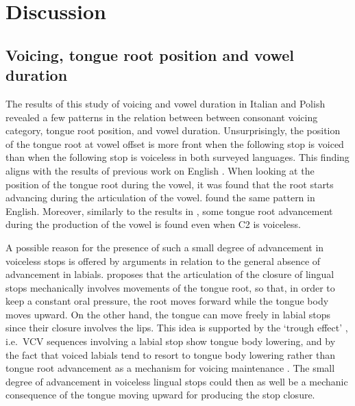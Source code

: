 \documentclass[12pt,]{article}
\begin{document}
\hypertarget{discussion}{%
\section{Discussion}\label{discussion}}

\label{s:discussion}

\hypertarget{voicing-tongue-root-position-and-vowel-duration}{%
\subsection{Voicing, tongue root position and vowel
duration}\label{voicing-tongue-root-position-and-vowel-duration}}

The results of this study of voicing and vowel duration in Italian and
Polish revealed a few patterns in the relation between between consonant
voicing category, tongue root position, and vowel duration.
Unsurprisingly, the position of the tongue root at vowel offset is more
front when the following stop is voiced than when the following stop is
voiceless in both surveyed languages. This finding aligns with the
results of previous work on English
\citep{kent1969, perkell1969, westbury1983, ahn2018}. When looking at
the position of the tongue root during the vowel, it was found that the
root starts advancing during the articulation of the vowel.
\citet{westbury1983} found the same pattern in English. Moreover,
similarly to the results in \citet{westbury1983}, some tongue root
advancement during the production of the vowel is found even when C2 is
voiceless.

A possible reason for the presence of such a small degree of advancement
in voiceless stops is offered by arguments in relation to the general
absence of advancement in labials. \citet{westbury1983} proposes that
the articulation of the closure of lingual stops mechanically involves
movements of the tongue root, so that, in order to keep a constant oral
pressure, the root moves forward while the tongue body moves upward. On
the other hand, the tongue can move freely in labial stops since their
closure involves the lips. This idea is supported by the `trough effect'
\citep{vazquez-alvarez2007}, i.e.~VCV sequences involving a labial stop
show tongue body lowering, and by the fact that voiced labials tend to
resort to tongue body lowering rather than tongue root advancement as a
mechanism for voicing maintenance
\citep{perkell1969, westbury1983, ahn2018}. The small degree of
advancement in voiceless lingual stops could then as well be a mechanic
consequence of the tongue moving upward for producing the stop closure.
\end{document}
